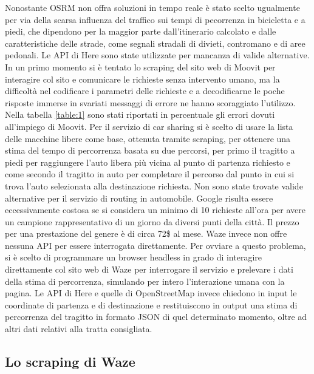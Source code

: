 Nonostante OSRM non offra soluzioni in tempo reale è stato scelto ugualmente per via della scarsa influenza del traffico sui tempi di pecorrenza in bicicletta e a piedi, che dipendono per la maggior parte dall'itinerario calcolato e dalle caratteristiche delle strade, come segnali stradali di divieti, contromano e di aree pedonali. Le API di Here sono state utilizzate per mancanza di valide alternative. In un primo momento si è tentato lo scraping del sito web di Moovit per interagire col sito e comunicare le richieste senza intervento umano, ma la difficoltà nel codificare i parametri delle richieste e a decodificarne le poche risposte immerse in svariati messaggi di errore ne hanno scoraggiato l'utilizzo. Nella tabella \ref{table:1} sono stati riportati in percentuale gli errori dovuti all'impiego di Moovit. Per il servizio di car sharing si è scelto di usare la lista delle macchine libere come base, ottenuta tramite scraping, per ottenere una stima del tempo di percorrenza basata su due percorsi, per primo il tragitto a piedi per raggiungere l'auto libera più vicina al punto di partenza richiesto e come secondo il tragitto in auto per completare il percorso dal punto in cui si trova l'auto selezionata alla destinazione richiesta. Non sono state trovate valide alternative per il servizio di routing in automobile. Google risulta essere eccessivamente costosa se si considera un minimo di 10 richieste all'ora per avere un campione rappresentativo di un giorno da diversi punti della città. Il prezzo per una prestazione del genere è di circa 72\$ al mese. Waze invece non offre nessuna API per essere interrogata direttamente. Per ovviare a questo problema, si è scelto di programmare un browser headless in grado di interagire direttamente col sito web di Waze per interrogare il servizio e prelevare i dati della stima di percorrenza, simulando per intero l'interazione umana con la pagina. Le API di Here e quelle di OpenStreetMap invece chiedono in input le coordinate di partenza e di destinazione e restituiscono in output una stima di percorrenza del tragitto in formato JSON di quel determinato momento, oltre ad altri dati relativi alla tratta consigliata.

\subsection{Lo scraping di Waze}

